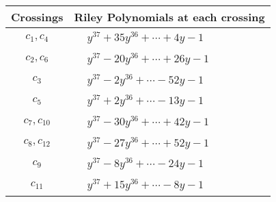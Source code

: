 \documentclass[1p]{elsarticle_modified}
\theoremstyle{definition}
\begin{document}
\begin{tabular}{m{50pt}|m{274pt}}
Crossings & \hspace{64pt}Riley Polynomials at each crossing \\
\hline $$\begin{aligned}c_{1},c_{4}\end{aligned}$$&$\begin{aligned}
&y^{37}+35 y^{36}+\cdots+4 y-1
\end{aligned}$\\
\hline $$\begin{aligned}c_{2},c_{6}\end{aligned}$$&$\begin{aligned}
&y^{37}-20 y^{36}+\cdots+26 y-1
\end{aligned}$\\
\hline $$\begin{aligned}c_{3}\end{aligned}$$&$\begin{aligned}
&y^{37}-2 y^{36}+\cdots-52 y-1
\end{aligned}$\\
\hline $$\begin{aligned}c_{5}\end{aligned}$$&$\begin{aligned}
&y^{37}+2 y^{36}+\cdots-13 y-1
\end{aligned}$\\
\hline $$\begin{aligned}c_{7},c_{10}\end{aligned}$$&$\begin{aligned}
&y^{37}-30 y^{36}+\cdots+42 y-1
\end{aligned}$\\
\hline $$\begin{aligned}c_{8},c_{12}\end{aligned}$$&$\begin{aligned}
&y^{37}-27 y^{36}+\cdots+52 y-1
\end{aligned}$\\
\hline $$\begin{aligned}c_{9}\end{aligned}$$&$\begin{aligned}
&y^{37}-8 y^{36}+\cdots-24 y-1
\end{aligned}$\\
\hline $$\begin{aligned}c_{11}\end{aligned}$$&$\begin{aligned}
&y^{37}+15 y^{36}+\cdots-8 y-1
\end{aligned}$\\
\hline
\end{tabular}\\~\\
\end{document}
